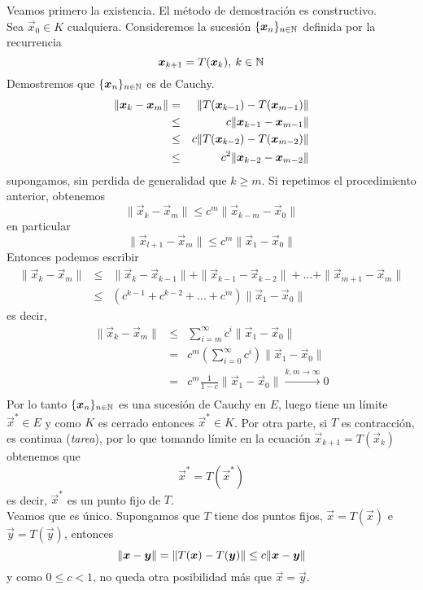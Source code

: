 \begin{demostracion}
Veamos primero la existencia. El m\'etodo de demostraci\'on es constructivo.
\\Sea $\vec{x}_0\in K$ cualquiera. Consideremos la sucesi\'on $\{\boldsymbol{x}_n\}_{n\in \mathbb{N}}$ definida por la recurrencia $$\boldsymbol{x}_{k+1}=T(\boldsymbol{x}_k),\: k\in \mathbb{N}$$ Demostremos que $\{\boldsymbol{x}_n\}_{n \in \mathbb{N}}$ es de Cauchy.
\begin{eqnarray*}
\|\boldsymbol{x}_k-\boldsymbol{x}_m\| & =   & \|T(\boldsymbol{x}_{k-1})-T(\boldsymbol{x}_{m-1})\|     \\ 
            &\leq & c\|\boldsymbol{x}_{k-1}-\boldsymbol{x}_{m-1}\|          \\ 
            &\leq & c\lVert T(\boldsymbol{x}_{k-2})-T(\boldsymbol{x}_{m-2})\rVert \\
            &\leq & c^2\|\boldsymbol{x}_{k-2}-\boldsymbol{x}_{m-2}\|
\end{eqnarray*}
supongamos, sin perdida de generalidad que $k \geq m$. Si repetimos el procedimiento anterior, obtenemos 
$$\|\vec{x}_k-\vec{x}_m\|\leq c^m\|\vec{x}_{k-m}-\vec{x}_0\|$$ 
en particular 
$$\|\vec{x}_{l+1}-\vec{x}_{m}\|\leq c^m\|\vec{x}_{1}-\vec{x}_{0}\|$$ 
Entonces podemos escribir
\begin{eqnarray*}
\|\vec{x}_{k}-\vec{x}_{m}\| &\leq& \|\vec{x}_{k}-\vec{x}_{k-1}\|+\|\vec{x}_{k-1}-\vec{x}_{k-2}\|+\dots+\|\vec{x}_{m+1}-\vec{x}_{m}\| \\ 
                &\leq &(c^{k-1}+c^{k-2}+\dots+c^{m})\|\vec{x}_{1}-\vec{x}_{0}\| 
\end{eqnarray*} 
es decir,
\begin{eqnarray*}
\|\vec{x}_{k}-\vec{x}_{m}\| &\leq & \sum_{i=m}^{\infty}c^i\|\vec{x}_{1}-\vec{x}_{0}\|       \\
                &  =  & c^m\left(\sum_{i=0}^{\infty}c^i\right)\|\vec{x}_{1}-\vec{x}_{0}\|  \\
                &  =  & c^m\frac{1}{1-c}\|\vec{x}_{1}-\vec{x}_{0}\|\stackrel{k,m\to \infty}{\to} 0 \\ 
\end{eqnarray*} 
Por lo tanto $\{\boldsymbol{x}_n\}_{n\in\mathbb{N}}$ es una sucesi\'on de Cauchy en $E$, luego tiene un l\'imite $\vec{x}^* \in E$ y como  $K$ es cerrado entonces $\vec{x}^* \in K$. Por otra parte, si $T$ es contracci\'on, es continua (\emph{tarea}), por lo que tomando l\'imite en la ecuaci\'on $\vec{x}_{k+1}=T(\vec{x}_k)$ obtenemos que \[\vec{x}^*=T(\vec{x}^*)\] es
decir, $\vec{x}^*$ es un punto fijo de $T$. \\ Veamos que es \'unico. Supongamos que $T$ tiene dos puntos fijos, $\vec{x}=T(\vec{x})$ e $\vec{y}=T(\vec{y})$, entonces
\[\lVert\boldsymbol{x}-\boldsymbol{y}\rVert=\lVert T(\boldsymbol{x})-T(\boldsymbol{y})\rVert\leq c\lVert\boldsymbol{x}-\boldsymbol{y}\rVert\] 
y como $0\leq c<1$, no queda otra posibilidad m\'as que $\vec{x}=\vec{y}$.
\end{demostracion}

